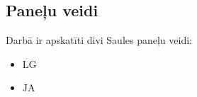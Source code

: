 \subsection{Paneļu veidi}

Darbā ir apskatīti divi Saules paneļu veidi:
\begin{itemize}
	\item LG
	\item JA
\end{itemize}




